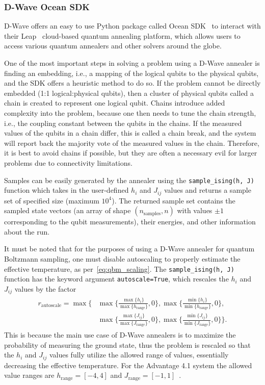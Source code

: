 \subsubsection{D-Wave Ocean SDK}
D-Wave offers an easy to use Python package called Ocean SDK~\cite{dwave_ocean} to interact with their Leap~\cite{dwave_leap} cloud-based quantum annealing platform, which allows users to access various quantum annealers and other solvers around the globe.

One of the most important steps in solving a problem using a D-Wave annealer is finding an embedding, i.e., a mapping of the logical qubits to the physical qubits, and the SDK offers a heuristic method to do so.
If the problem cannot be directly embedded (1:1 logical:physical qubits), then a cluster of physical qubits called a chain is created to represent one logical qubit.
Chains introduce added complexity into the problem, because one then needs to tune the chain strength, i.e., the coupling constant between the qubits in the chains.
If the measured values of the qubits in a chain differ, this is called a chain break, and the system will report back the majority vote of the measured values in the chain.
Therefore, it is best to avoid chains if possible, but they are often a necessary evil for larger problems due to connectivity limitations.

Samples can be easily generated by the annealer using the \texttt{sample\_ising(h, J)} function which takes in the user-defined \( h_i \) and \( J_{ij} \) values and returns a sample set of specified size (maximum \( 10^4 \)).
The returned sample set contains the sampled state vectors (an array of shape \( (n_\text{samples}, n) \) with values \( \pm 1 \) corresponding to the qubit measurements), their energies, and other information about the run.

It must be noted that for the purposes of using a D-Wave annealer for quantum Boltzmann sampling, one must disable autoscaling to properly estimate the effective temperature, as per~\cref{eq:qbm_scaling}.
The \texttt{sample\_ising(h, J)} function has the keyword argument \texttt{autoscale=True}, which rescales the \( h_i \) and \( J_{ij} \) values by the factor~\cite{dwave_solver_parameters}
\begin{align}
\begin{split}
    r_\text{autoscale}
        = \max\Bigg\{
            &\max\bigg\{\frac{\max\{h_i\}}{\max\{h_\text{range}\}},0\bigg\},
            \max\bigg\{\frac{\min\{h_i\}}{\min\{h_\text{range}\}},0\bigg\}, \\
            &\max\bigg\{\frac{\max\{J_{ij}\}}{\max\{J_\text{range}\}},0\bigg\},
            \max\bigg\{\frac{\min\{J_{ij}\}}{\min\{J_\text{range}\}},0\bigg\}
        \Bigg\}.
\end{split}
\end{align}
This is because the main use case of D-Wave annealers is to maximize the probability of measuring the ground state, thus the problem is rescaled so that the \( h_i \) and \( J_{ij} \) values fully utilize the allowed range of values, essentially decreasing the effective temperature.
For the Advantage 4.1 system the allowed value ranges are \( h_\text{range} = [-4, 4] \) and \( J_\text{range} = [-1, 1] \)~\cite{dwave_solver_properties}.

